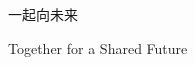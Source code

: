 \documentclass{ctexart}
\begin{document}
    一起向未来
    
    Together for a Shared Future
\end{document}
